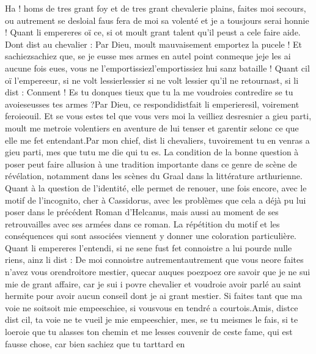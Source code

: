 \documentclass{article}
\begin{document}
\begin{pages}
   Ha ! homs de tres grant foy et de tres 
      grant chevalerie plains,
      faites moi secours, ou autrement se desloial 
         faus fera de moi sa volenté
      et je a tousjours serai honnie !
   Quant li empereres oï ce, si ot moult grant talent qu’il peust a cele faire aide. 
   Dont dist au chevalier :
   Par Dieu, moult mauvaisement emportez la pucele ! 
      Et sachiezsachiez que, se je eusse mes armes 
      en autel point 
      conmeque 
      jeje les ai aucune fois eues, 
      vous ne 
      l’emportissiezl'emportissiez hui sanz bataille ! 
   Quant cil oï l’empereeur, 
   si ne volt lessierlessier si ne volt lessier 
   qu’il ne retournast, si li dist :
   Conment ! Es tu donques tieux que tu la me voudroies contredire se tu 
      avoieseusses 
      tes armes ?Par Dieu, ce respondidistfait 
      li emperieresil, voirement 
      feroieouil. 
      Et se vous estes tel que vous vers moi la veilliez desresnier a gieu parti, 
      moult me metroie volentiers en aventure de lui tenser 
      et garentir selonc ce que elle me fet entendant.Par mon chief, dist li chevaliers, 
      tuvoirement tu en venras a gieu parti, mes que 
      tutu me die qui tu es.
   La condition de la bonne question à poser peut faire allusion à une tradition importante dans ce genre de
   scène de révélation, notamment dans les scènes du Graal dans la littérature arthurienne. Quant à la question de l'identité, elle 
   permet de renouer, une fois encore, avec le motif de l'incognito, cher à Cassidorus, avec les problèmes que cela a déjà pu lui 
   poser dans le précédent Roman d'Helcanus, mais aussi au moment de ses retrouvailles avec ses armées dans ce roman. La répétition
   du motif et les conséquences qui sont associées viennent y donner une coloration particulière.
 \pend
\pstart Quant li empereres l’entendi, 
   si ne sene fust fet connoistre a lui 
   pourde 
   nulle riens, ainz li dist :
   De moi connoistre 
      autrementautrement que vous 
         neore faites 
      n’avez vous orendroitore mestier, 
      quecar auques 
      poezpoez ore savoir que 
   je ne sui mie de grant affaire, car je sui i povre chevalier 
   et voudroie avoir parlé au saint hermite pour 
      avoir aucun conseil dont je ai 
      grant mestier. 
      Si faites tant que ma voie ne soitsoit mie empeeschiee, 
      si vousvous en tendré a courtois.Amis, distce dist cil, ta voie ne 
      te vueil je mie empeeschier, mes, 
      se tu meismes le fais, si te loeroie que tu alasses ton chemin et me lesses 
      couvenir de 
      ceste fame, qui est 
         fausse chose, car bien sachiez que tu tarttard en 

\end{pages}
\end{document}
